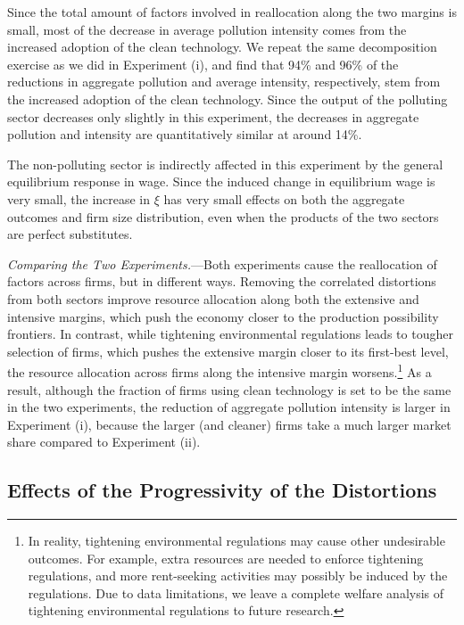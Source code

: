 \documentclass[AEJ]{AEA}
\begin{document}
Since the total amount of factors involved in reallocation along the two margins is small, most of the decrease in average pollution intensity comes from the increased adoption of the clean technology. We repeat the same decomposition exercise as we did in Experiment (i), and find that 94\% and 96\% of the reductions in aggregate pollution and average intensity, respectively, stem from the increased adoption of the clean technology. Since the output of the polluting sector decreases only slightly in this experiment, the decreases in aggregate pollution and intensity are quantitatively similar at around 14\%.

The non-polluting sector is indirectly affected in this experiment by the general equilibrium response in wage. Since the induced change in equilibrium wage is very small, the increase in $\xi$ has very small effects on both the aggregate outcomes and firm size distribution, even when the products of the two sectors are perfect substitutes.

\textit{Comparing the Two Experiments.}---Both experiments cause the reallocation of factors across firms, but in different ways. Removing the correlated distortions from both sectors improve resource allocation along both the extensive and intensive margins, which push the economy closer to the production possibility frontiers. In contrast, while tightening environmental regulations leads to tougher selection of firms, which pushes the extensive margin closer to its first-best level, the resource allocation across firms along the intensive margin worsens.\footnote{In reality, tightening environmental regulations may cause other undesirable outcomes. For example, extra resources are needed to enforce tightening regulations, and more rent-seeking activities may possibly be induced by the regulations. Due to data limitations, we leave a complete welfare analysis of tightening environmental regulations to future research.} As a result, although the fraction of firms using clean technology is set to be the same in the two experiments, the reduction of aggregate pollution intensity is larger in Experiment (i), because the larger (and cleaner) firms take a much larger market share compared to Experiment (ii).

\subsection{Effects of the Progressivity of the Distortions}
\label{sec:progressivity}
\end{document}
